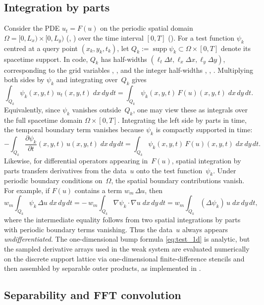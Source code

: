 \documentclass{report}
\theoremstyle{plain}
\theoremstyle{remark}
\numberwithin{equation}{section}              %
\begin{document}
\subsection{Integration by parts}
\label{subsec:ibp}

Consider the PDE $u_t = F(u)$ on the periodic spatial domain
$\Omega=[0,L_x)\times[0,L_y)$ (, ) over the time interval
$[0,T]$ ().  For a test function $\psi_k$ centred at a query point
$(x_k,y_k,t_k)$, let $Q_k := \operatorname{supp}\psi_k
\subset \Omega\times[0,T]$ denote its spacetime support.  In code,
$Q_k$ has half-widths $(\ell_t\Delta t,\ell_x\Delta x,\ell_y\Delta y)$,
corresponding to the grid variables , ,  and the
integer half-widths , , .  Multiplying both sides
by $\psi_k$ and integrating over~$Q_k$ gives
\[
  \int_{Q_k} \psi_k(x,y,t)\,u_t(x,y,t)\;dx\,dy\,dt
  = \int_{Q_k} \psi_k(x,y,t)\,F(u)(x,y,t)\;dx\,dy\,dt.
\]
Equivalently, since $\psi_k$ vanishes outside~$Q_k$, one may view these as
integrals over the full spacetime domain $\Omega\times[0,T]$.  Integrating
the left side by parts in time, the temporal boundary term vanishes because
$\psi_k$ is compactly supported in time:
\begin{equation}
  -\int_{Q_k} \frac{\partial\psi_k}{\partial t}(x,y,t)\,u(x,y,t)\;dx\,dy\,dt
  = \int_{Q_k} \psi_k(x,y,t)\,F(u)(x,y,t)\;dx\,dy\,dt.
  \label{eq:ibp_temporal}
\end{equation}
Likewise, for differential operators appearing in~$F(u)$, spatial
integration by parts transfers derivatives from the data~$u$ onto the test
function~$\psi_k$.  Under periodic boundary conditions on~$\Omega$, the
spatial boundary contributions vanish.  For example, if $F(u)$ contains a
term $w_m\,\Delta u$, then
\[
  w_m\int_{Q_k}\psi_k\,\Delta u\;dx\,dy\,dt
  = -\,w_m\int_{Q_k}\nabla\psi_k\cdot\nabla u\;dx\,dy\,dt
  = w_m\int_{Q_k}(\Delta\psi_k)\,u\;dx\,dy\,dt,
\]
where the intermediate equality follows from two spatial integrations by
parts with periodic boundary terms vanishing.  Thus the data~$u$ always appears
\emph{undifferentiated}.  The one-dimensional bump formula
\eqref{eq:test_1d} is analytic, but the sampled derivative arrays used in
the weak system are evaluated numerically on the discrete support lattice
via one-dimensional finite-difference stencils and then assembled by
separable outer products, as implemented in
.

\subsection{Separability and FFT convolution}
\label{subsec:fft_conv}
\end{document}
